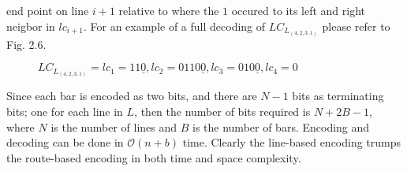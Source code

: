 end point on line $i+1$ relative to where the $1$ occured to its left and 
right neigbor in $lc_{i+1}$. For an example of a full decoding of $LC_{L_{(4,2,3,1)}}$
please refer to Fig. 2.6.\pagebreak
\begin{figure}[!htp]
    \begin{center}
      

    \end{center}
    \caption{$LC_{L_{(4,2,3,1)}}=lc_{1}=11\underline{0},lc_{2}=0110\underline{0},lc_{3}=010\underline{0},lc_{4}=0$}
\end{figure}

Since each bar is encoded as two bits, and there are $N-1$ bits as terminating bits; 
one for each line in $L$, then the number of bits required is $N + 2B -1$, where $N$
is the number of lines and $B$ is the number of bars. Encoding and decoding can be 
done in $\mathcal{O}(n+b)$ time. Clearly the line-based encoding 
trumps the route-based encoding in both time and space complexity.

